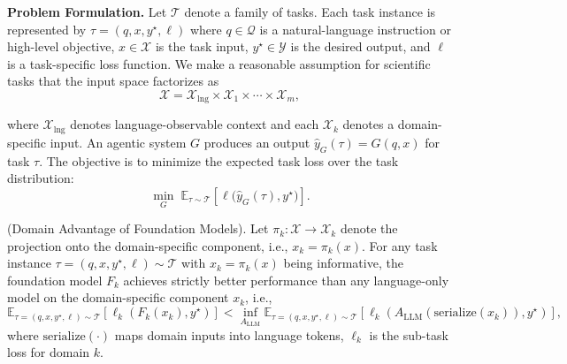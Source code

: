 \textbf{Problem Formulation.}
Let $\mathcal{T}$ denote a family of tasks. Each task instance is represented by $\tau = (q, x, y^\star, \ell)$
where $q \in \mathcal{Q}$ is a natural-language instruction or high-level objective, $x \in \mathcal{X}$ is the task input, $y^\star \in \mathcal{Y}$ is the desired output, and $\ell$ is a task-specific loss function.
We make a reasonable assumption for scientific tasks that the input space factorizes as 
\begin{equation}
    \mathcal{X} = \mathcal{X}_{\mathrm{lng}} \times \mathcal{X}_{1} \times \cdots \times \mathcal{X}_{m},
\end{equation}

where $\mathcal{X}_{\mathrm{lng}}$ denotes language-observable context and each $\mathcal{X}_k$ denotes a domain-specific input.
An agentic system $G$ produces an output $\hat{y}_G(\tau) = G(q, x)$ for task $\tau$. The objective is to minimize the expected task loss over the task distribution:
\begin{equation}
    \min_G \; \mathbb{E}_{\tau \sim \mathcal{T}} \left[ \ell\big(\hat{y}_G(\tau), y^\star \big) \right].
\end{equation}


\begin{assumption}\label{assumption: domain advantage}
(Domain Advantage of Foundation Models).
Let $\pi_k : \mathcal{X} \to \mathcal{X}_k$ denote the projection onto the domain-specific component, i.e., $x_k = \pi_k(x)$.
For any task instance $\tau = (q, x, y^\star, \ell) \sim \mathcal{T}$ with $x_k = \pi_k(x)$ being informative, the foundation model $F_k$ achieves strictly better performance than any language-only model on the domain-specific component $x_k$, i.e.,
\begin{equation}
\mathbb{E}_{\tau = (q, x, y^\star, \ell) \sim \mathcal{T}} \left[ \ell_k(F_k(x_k), y^\star) \right]
<
\inf_{A_{\mathrm{LLM}}} 
\mathbb{E}_{\tau = (q, x, y^\star, \ell) \sim \mathcal{T}} \left[ \ell_k(A_{\mathrm{LLM}}(\text{serialize}(x_k)), y^\star) \right],
\end{equation}
where $\text{serialize}(\cdot)$ maps domain inputs into language tokens, $\ell_k$ is the sub-task loss for domain $k$.
\end{assumption}
